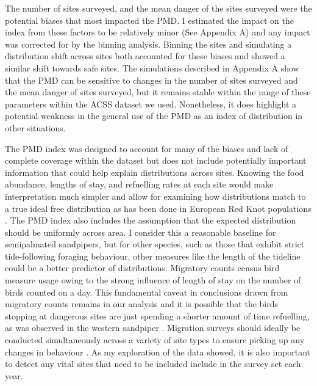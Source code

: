 The number of sites surveyed, and the mean danger of the sites surveyed were the potential biases that most impacted the PMD. I estimated the impact on the index from these factors to be relatively minor (See Appendix A) and any impact was corrected for by the binning analysis. Binning the sites and simulating a distribution shift across sites both accounted for these biases and showed a similar shift towards safe sites. The simulations described in Appendix A show that the PMD can be sensitive to changes in the number of sites surveyed and the mean danger of sites surveyed, but it remains stable within the range of these parameters within the ACSS dataset we used. Nonetheless, it does highlight a potential weakness in the general use of the PMD as an index of distribution in other situations.

The PMD index was designed to account for many of the biases and lack of complete coverage within the dataset but does not include potentially important information that could help explain distributions across sites. Knowing the food abundance, lengths of stay, and refuelling rates at each site would make interpretation much simpler and allow for examining how distributions match to a true ideal free distribution as has been done in European Red Knot populations \citep{Gils2006}. The PMD index also includes the assumption that the expected distribution should be uniformly across area. I consider this a reasonable baseline for semipalmated sandpipers, but for other species, such as those that exhibit strict tide-following foraging behaviour, other measures like the length of the tideline could be a better predictor of distributions. Migratory counts census bird measure usage owing to the strong influence of length of stay on the number of birds counted on a day. This fundamental caveat in conclusions drawn from migratory counts remains in our analysis and it is possible that the birds stopping at dangerous sites are just spending a shorter amount of time refuelling, as was observed in the western sandpiper \citep{ydenberg_western_2004}. Migration surveys should ideally be conducted simultaneously across a variety of site types to ensure picking up any changes in behaviour \citep{Crewe2015b}. As my exploration of the data showed, it is also important to detect any vital sites that need to be included include in the survey set each year. 

